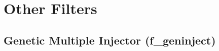 \documentclass{article}
\begin{document}
%

\section*{Other Filters}

%

\subsection*{Genetic Multiple Injector (f\_geninject)}
\end{document}
